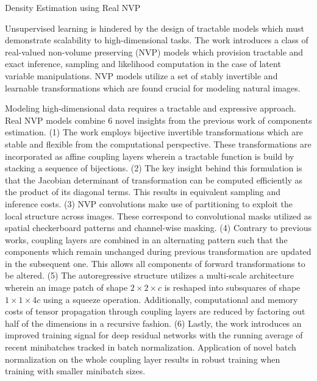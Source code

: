 \documentclass[11pt,letterpaper]{article}
\begin{document}
\begin{center}
  \large{Density Estimation using Real NVP
  }
\end{center}

Unsupervised learning is hindered by the design of tractable models which must demonstrate scalability to high-dimensional tasks. The work introduces a class of real-valued non-volume preserving (NVP) models which provision tractable and exact inference, sampling and likelihood computation in the case of latent variable manipulations. NVP models utilize a set of stably invertible and learnable transformations which are found crucial for modeling natural images.

Modeling high-dimensional data requires a tractable and expressive approach. Real NVP models combine 6 novel insights from the previous work of components estimation. (1) The work employs bijective invertible transformations which are stable and flexible from the computational perspective. These transformations are incorporated as affine coupling layers wherein a tractable function is build by stacking a sequence of bijections. (2) The key insight behind this formulation is that the Jacobian determinant of transformation can be computed efficiently as the product of its diagonal terms. This results in equivalent sampling and inference costs. (3) NVP convolutions make use of partitioning to exploit the local structure across images. These correspond to convolutional masks utilized as spatial checkerboard patterns and channel-wise masking. (4) Contrary to previous works, coupling layers are combined in an alternating pattern such that the components which remain unchanged during previous transformation are updated in the subsequent one. This allows all components of forward transformations to be altered. (5) The autoregressive structure utilizes a multi-scale architecture wherein an image patch of shape $2 \times 2 \times c$ is reshaped into subsquares of shape $1 \times 1 \times 4c$ using a squeeze operation. Additionally, computational and memory costs of tensor propagation through coupling layers are reduced by factoring out half of the dimensions in a recursive fashion. (6) Lastly, the work introduces an improved training signal for deep residual networks with the running average of recent minibatches tracked in batch normalization. Application of novel batch normalization on the whole coupling layer results in robust training when training with smaller minibatch sizes. 
\end{document}

